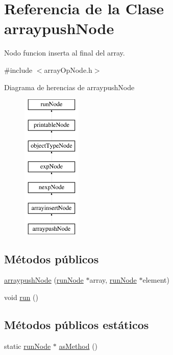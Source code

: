 \hypertarget{classarraypushNode}{\section{Referencia de la Clase arraypush\-Node}
\label{classarraypushNode}
}


Nodo funcion inserta al final del array.  




{\ttfamily \#include $<$array\-Op\-Node.\-h$>$}

Diagrama de herencias de arraypush\-Node\begin{figure}[H]
\begin{center}
\leavevmode
\includegraphics[height=7.000000cm]{classarraypushNode}
\end{center}
\end{figure}
\subsection*{Métodos públicos}
\begin{DoxyCompactItemize}
\item 
\hyperlink{classarraypushNode_ae2b0715919f55da61278a0469db2d1dd}{arraypush\-Node} (\hyperlink{classrunNode}{run\-Node} $\ast$array, \hyperlink{classrunNode}{run\-Node} $\ast$element)
\item 
void \hyperlink{classarraypushNode_a6eb706763d3f8cc7715706005d4bf049}{run} ()
\end{DoxyCompactItemize}
\subsection*{Métodos públicos estáticos}
\begin{DoxyCompactItemize}
\item 
static \hyperlink{classrunNode}{run\-Node} $\ast$ \hyperlink{classarraypushNode_afa60c2664e930e0f6328ad9f4086d65e}{as\-Method} ()
\end{DoxyCompactItemize}


